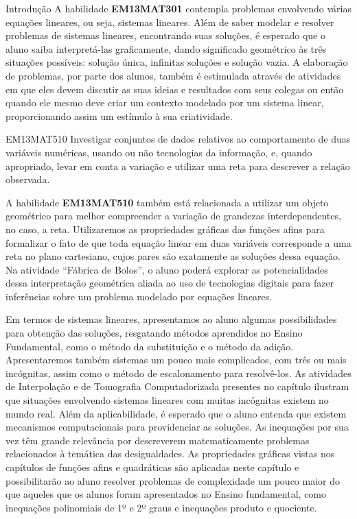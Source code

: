 \begin{apresentacao}{Introdução}
A habilidade \textbf{EM13MAT301} contempla problemas envolvendo várias equações lineares, ou seja, sistemas lineares. Além de saber modelar e resolver problemas de sistemas lineares, encontrando suas soluções, é esperado que o aluno saiba interpretá-las graficamente, dando significado geométrico às três situações possíveis: solução única, infinitas soluções e solução vazia. A elaboração de problemas, por parte dos alunos, também é estimulada através de atividades em que eles devem discutir as suas ideias e resultados com seus colegas ou então quando ele mesmo deve criar um contexto modelado por um sistema linear, proporcionando assim um estímulo à sua criatividade. 

\begin{habilities}{EM13MAT510}
Investigar conjuntos de dados relativos ao comportamento de duas variáveis numéricas, usando ou não tecnologias da informação, e, quando apropriado, levar em conta a variação e utilizar uma reta para descrever a relação observada.
\end{habilities}

A habilidade \textbf{EM13MAT510} também está relacionada a utilizar um objeto geométrico para melhor compreender a variação de grandezas interdependentes, no caso, a reta. Utilizaremos as propriedades gráficas das funções afins para formalizar o fato de que toda equação linear em duas variáveis corresponde a uma reta no plano cartesiano, cujos pares são exatamente as soluções dessa equação. Na atividade “Fábrica de Bolos”, o aluno poderá explorar as potencialidades dessa interpretação geométrica aliada ao uso de tecnologias digitais para fazer inferências sobre um problema modelado por equações lineares.


Em termos de sistemas lineares, apresentamos ao aluno algumas possibilidades para obtenção das soluções, resgatando métodos aprendidos no Ensino Fundamental, como o método da substituição e o método da adição. Apresentaremos também sistemas um pouco mais complicados, com três ou mais incógnitas, assim como o método de escalonamento para resolvê-los. As atividades de Interpolação e de Tomografia Computadorizada presentes no capítulo ilustram que situações envolvendo sistemas lineares com muitas incógnitas existem no mundo real. Além da aplicabilidade, é esperado que o aluno entenda que existem mecanismos computacionais para providenciar as soluções.
As inequações por sua vez têm grande relevância por descreverem matematicamente problemas relacionados à temática das desigualdades. As propriedades gráficas vistas nos capítulos de funções afins e quadráticas são aplicadas neste capítulo e possibilitarão ao aluno resolver problemas de complexidade um pouco maior do que aqueles que os alunos foram apresentados no Ensino fundamental, como inequações polinomiais de 1º e 2º graus e inequações produto e quociente.




\end{apresentacao}
